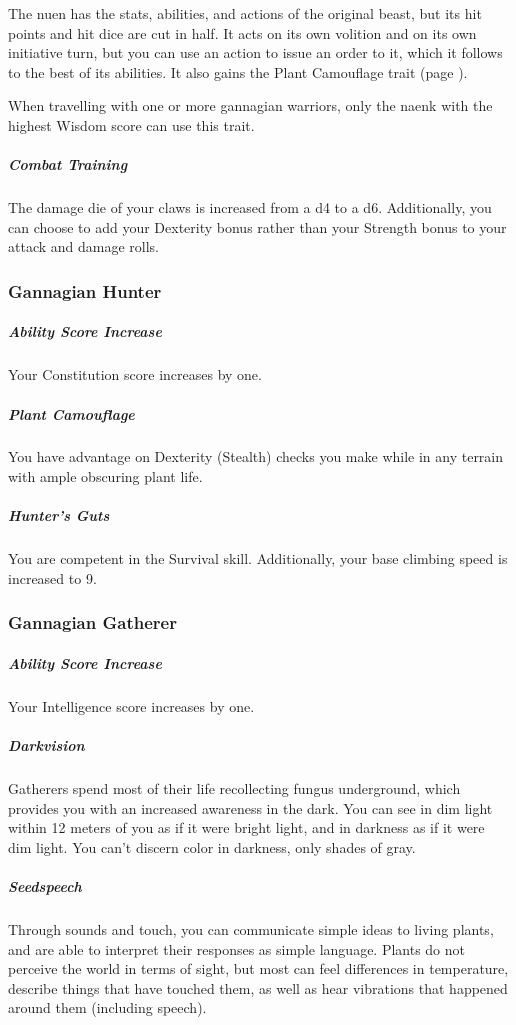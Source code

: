     The nuen has the stats, abilities, and actions of the original beast, but its hit points and hit dice are cut in half.
    It acts on its own volition and on its own initiative turn, but you can use an action to issue an order to it, which it follows to the best of its abilities.
    It also gains the Plant Camouflage trait (page \pageref{trait::plantcamouflage}).

    When travelling with one or more gannagian warriors, only the naenk with the highest Wisdom score can use this trait.

    \subparagraph{Combat Training} The damage die of your claws is increased from a d4 to a d6.
    Additionally, you can choose to add your Dexterity bonus rather than your Strength bonus to your attack and damage rolls.

\subsubsection{Gannagian Hunter}
    \subparagraph{Ability Score Increase} Your Constitution score increases by one.

    \subparagraph{Plant Camouflage} You have advantage on Dexterity (Stealth) checks you make while in any terrain with ample obscuring plant life. \label{trait::plantcamouflage}

    \subparagraph{Hunter's Guts} You are competent in the Survival skill.
    Additionally, your base climbing speed is increased to 9.

\subsubsection{Gannagian Gatherer}
    \subparagraph{Ability Score Increase} Your Intelligence score increases by one.

    \subparagraph{Darkvision} Gatherers spend most of their life recollecting fungus underground, which provides you with an increased awareness in the dark.
    You can see in dim light within 12 meters of you as if it were bright light, and in darkness as if it were dim light.
    You can't discern color in darkness, only shades of gray.

    \subparagraph{Seedspeech} Through sounds and touch, you can communicate simple ideas to living plants, and are able to interpret their responses as simple language.
    Plants do not perceive the world in terms of sight, but most can feel differences in temperature, describe things that have touched them, as well as hear vibrations that happened around them (including speech).

